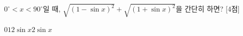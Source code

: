 $0^\circ<x<90^\circ$일 때, $\sqrt{(1-\sin x)^2}+\sqrt{(1+\sin x)^2}$을 간단히 하면? \mbox{[4점]}
\begin{choices32}{$0$}{$1$}{$2$}{$\sin x$}{$2\sin x$}\end{choices32}
